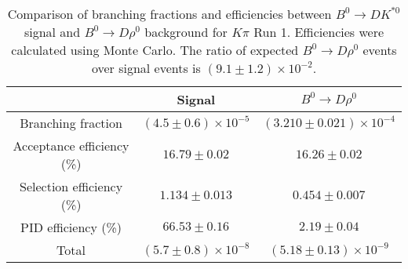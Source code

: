 \begin{table}
    \centering
    \begin{tabular}{ccc}
        \toprule
        & Signal & $B^0 \to D\rho^0$ \\
        \midrule
        Branching fraction & $(4.5 \pm 0.6) \times 10^{-5}$ & $(3.210 \pm 0.021) \times 10^{-4}$ \\
        Acceptance efficiency (\%) & $16.79 \pm 0.02$ & $16.26 \pm 0.02$ \\
        Selection efficiency (\%) & $1.134 \pm 0.013$ & $0.454 \pm 0.007$ \\
        PID efficiency (\%) & $66.53 \pm 0.16$ & $2.19 \pm 0.04$ \\
        \midrule
        Total & $(5.7 \pm 0.8) \times 10^{-8}$ & $(5.18 \pm 0.13) \times 10^{-9}$ \\
        \bottomrule
        \end{tabular}
        \caption{Comparison of branching fractions and efficiencies between $B^0 \to DK^{*0}$ signal and $B^0 \to D\rho^0$ background for $K\pi$ Run 1. Efficiencies were calculated using Monte Carlo. The ratio of expected $B^0 \to D\rho^0$ events over signal events is $(9.1 \pm 1.2) \times 10^{-2}$.}
\label{tab:rho_efficiency_Kpi_run1}
\end{table}
